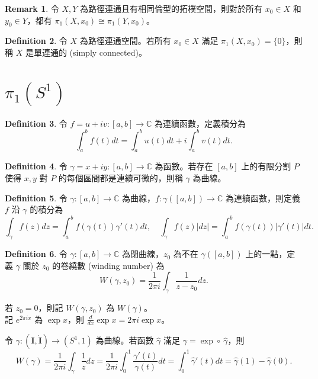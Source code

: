\documentclass[12pt]{article}
\theoremstyle{definition}
\newtheorem{definition}{Definition}[section]
\newtheorem{remark}[definition]{Remark}
\newcommand\<{\langle}
\renewcommand\>{\rangle}
\begin{document}
\begin{CJK}{UTF8}{bsmi}
\begin{remark}
    令 $X, Y$ 為路徑連通且有相同倫型的拓樸空間，則對於所有 $x_0\in X$ 和 $y_0\in Y$，都有 $\pi_1(X, x_0)\cong\pi_1(Y, x_0)$。
\end{remark}

\begin{definition}
    令 $X$ 為路徑連通空間。若所有 $x_0\in X$ 滿足 $\pi_1(X, x_0)=\{0\}$，則稱 $X$ 是單連通的 (simply connected)。
\end{definition}

\section{$\pi_1(S^1)$}

\begin{definition}
    令 $f=u+iv:[a, b]\to\mathbb{C}$ 為連續函數，定義積分為
    \[
        \int_a^b f(t) dt = \int_a^b u(t) dt+i\int_a^b v(t) dt.
    \]
\end{definition}

\begin{definition}
    令 $\gamma=x+iy:[a, b]\to\mathbb{C}$ 為函數。若存在 $[a, b]$ 上的有限分割 $P$ 使得 $x, y$ 對 $P$ 的每個區間都是連續可微的，則稱 $\gamma$ 為曲線。 
\end{definition}

\begin{definition}
    令 $\gamma:[a, b]\rightarrow\mathbb{C}$ 為曲線，$f:\gamma([a, b])\to\mathbb{C}$ 為連續函數，則定義 $f$ 沿 $\gamma$ 的積分為
    \[
        \int_\gamma f(z) dz = \int_a^b f(\gamma(t))\gamma'(t) dt,\quad
        \int_\gamma f(z) |dz| = \int_a^b f(\gamma(t))|\gamma'(t)| dt.
    \]
\end{definition}

\begin{definition}
    令 $\gamma:[a, b]\rightarrow\mathbb{C}$ 為閉曲線，$z_0$ 為不在 $\gamma([a, b])$ 上的一點，定義 $\gamma$ 關於 $z_0$ 的卷繞數 (winding number) 為 
    \[
        W(\gamma, z_0) 
        = \frac{1}{2\pi i}\int_\gamma\frac{1}{z-z_0}dz.
    \]
\end{definition}

若 $z_0=0$，則記 $W(\gamma, z_0)$ 為 $W(\gamma)$。 \\

記 $e^{2\pi ix}$ 為 $\exp x$，則 $\frac{d}{dx}\exp x=2\pi i\exp x$。

令 $\gamma:(\textbf{I}, \Dot{\textbf{I}})\to(S^1, 1)$ 為曲線。若函數 $\hat{\gamma}$ 滿足 $\gamma=\exp\circ\ \hat{\gamma}$，則 
\[
    W(\gamma) 
     = \frac{1}{2\pi i}\int_\gamma\frac{1}{z}dz 
     = \frac{1}{2\pi i}\int_0^1\frac{\gamma'(t)}{\gamma(t)}dt 
     = \int_0^1\hat{\gamma}'(t)dt 
     = \hat{\gamma}(1) - \hat{\gamma}(0).
\]


\end{CJK}
\end{document}
